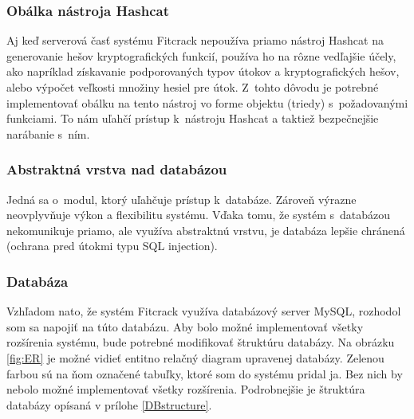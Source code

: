 \documentclass[zadani,slovak]{fitthesis}
\begin{document}
\subsubsection{Obálka nástroja Hashcat}
Aj keď serverová časť systému Fitcrack nepoužíva priamo nástroj Hashcat na generovanie hešov kryptografických funkcií, používa ho na rôzne vedľajšie účely, ako napríklad získavanie podporovaných typov útokov a kryptografických hešov, alebo výpočet veľkosti množiny hesiel pre útok. Z~tohto dôvodu je potrebné implementovať obálku na tento nástroj vo forme objektu (triedy) s~požadovanými funkciami. To nám uľahčí prístup k~nástroju Hashcat a taktiež bezpečnejšie narábanie s~ním.

\subsubsection{Abstraktná vrstva nad databázou}
Jedná sa o~modul, ktorý uľahčuje prístup k~databáze. Zároveň výrazne neovplyvňuje výkon a flexibilitu systému. Vďaka tomu, že systém s~databázou nekomunikuje priamo, ale využíva abstraktnú vrstvu, je databáza lepšie chránená (ochrana pred útokmi typu SQL injection).


\subsubsection{Databáza}\label{navrhDB}
Vzhľadom nato, že systém Fitcrack využíva databázový server MySQL, rozhodol som sa napojiť na túto databázu. Aby bolo možné implementovať všetky rozšírenia systému, bude potrebné modifikovať štruktúru databázy. Na obrázku \ref{fig:ER} je možné vidieť entitno relačný diagram upravenej databázy. Zelenou farbou sú na ňom označené tabuľky, ktoré som do systému pridal ja. Bez nich by nebolo možné implementovať všetky rozšírenia. Podrobnejšie je štruktúra databázy opísaná v prílohe \ref{DBstructure}.
\end{document}
